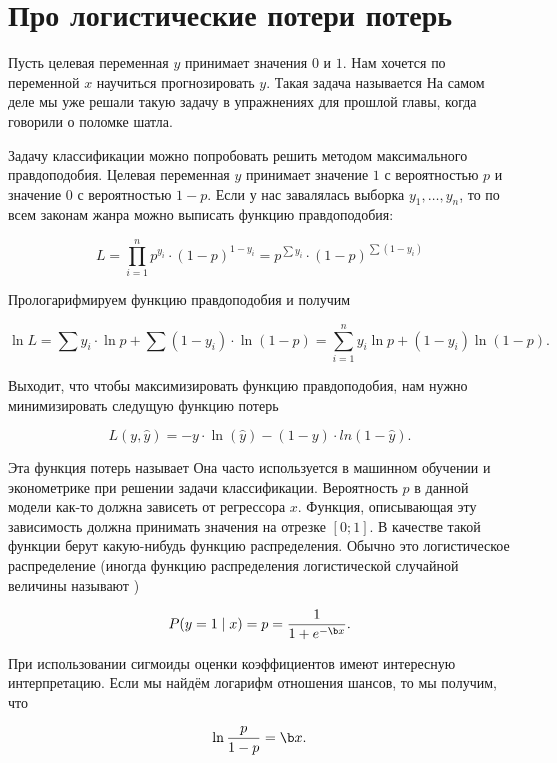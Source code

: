 


\section{Про логистические потери потерь}

Пусть целевая переменная $y$ принимает значения $0$ и $1$.  Нам хочется по переменной $x$ научиться прогнозировать $y$. Такая задача называется   На самом деле мы уже решали такую задачу в упражнениях для прошлой главы, когда говорили о поломке шатла. 

Задачу классификации можно попробовать решить методом максимального правдоподобия. Целевая переменная $y$ принимает значение $1$ с вероятностью $p$ и значение $0$ с вероятностью $1-p$.  Если у нас завалялась выборка $y_1, \ldots, y_n$, то по всем законам жанра можно выписать функцию правдоподобия: 

\[ L = \prod_{i=1}^n {p^{y_i} \cdot (1-p)^{1-y_i} }= p^{\sum y_i} \cdot (1 - p)^{\sum (1 - y_i)}\]

Прологарифмируем функцию правдоподобия и получим

\[ \ln L = \sum y_i \cdot \ln p + \sum(1 - y_i) \cdot \ln (1-p) = \sum_{i=1}^n y_i \ln p + (1- y_i) \ln (1-p).\]
 
Выходит, что чтобы максимизировать функцию правдоподобия, нам нужно минимизировать следущую функцию потерь

\[L(y, \hat y) = -y \cdot \ln (\hat  y) - (1-y) \cdot ln(1 - \hat y). \] 

Эта функция потерь называет  Она часто используется в машинном обучении и эконометрике при решении задачи классификации.  Вероятность $p$ в данной модели как-то должна зависеть от регрессора $x$.  Функция, описывающая эту зависимость должна принимать значения на отрезке $[0;1]$. В качестве такой функции берут какую-нибудь функцию распределения.  Обычно это логистическое распределение (иногда функцию распределения логистической случайной величины называют )

\[ P(y = 1 \mid x) = p =  \frac{1}{1 + e^{-\b x}}.\]

При использовании сигмоиды оценки коэффициентов имеют интересную интерпретацию. Если мы найдём логарифм отношения шансов, то мы получим, что 

\[ \ln \frac{p}{1-p} = \b x. \]


